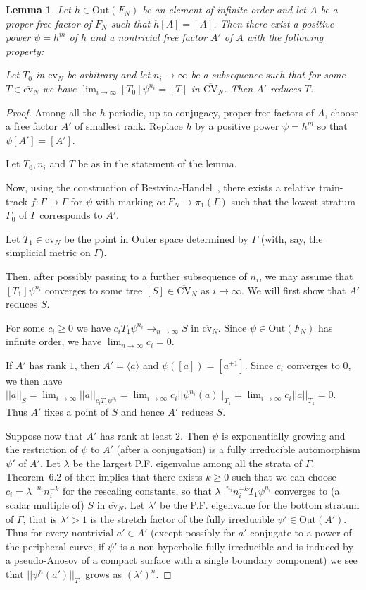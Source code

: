 \documentclass[10pt]{amsart}
\newcommand\<{\langle}
\renewcommand\>{\rangle}
\newcommand{\Out}{\mbox{Out}}
\newcommand{\cvn}{\mbox{cv}_N}
\newcommand{\cvnbar}{\overline{\mbox{cv}}_N}
\newcommand{\CVNbar}{\overline{\mbox{CV}}_N}
\newtheorem{lem}[thm]{Lemma}
\theoremstyle{definition}
\begin{document}
\begin{lem}\label{lem:reduce}
Let $h\in \Out(F_N)$ be an element of infinite order and let $A$ be a
proper free factor of $F_N$ such that $h[A]=[A]$. Then there exist a positive power $\psi=h^m$ of $h$ and a nontrivial
free factor $A'$ of $A$ with the following property:

 Let $T_0$ in $\cvn$ be arbitrary and let $n_i\to\infty$ be a
 subsequence such that for some $T\in\cvnbar$ we have $\lim_{i\to\infty} [T_0]\psi^{n_i}=[T]$ in $\CVNbar$.
 Then $A'$ reduces $T$.
\end{lem}


\begin{proof}
Among all the $h$-periodic, up to conjugacy, proper free factors of
$A$, choose a free factor $A'$ of smallest rank. Replace $h$ by a
positive power $\psi=h^m$ so that $\psi[A']=[A']$.

Let $T_0, n_i$ and $T$ be as in the statement of the lemma.

Now, using the construction of Bestvina-Handel~\cite{BH92},  there exists a relative train-track $f:\Gamma\to\Gamma$ for $\psi$ with
marking $\alpha:F_N\to\pi_1(\Gamma)$ such that the lowest
stratum $\Gamma_0$ of $\Gamma$ corresponds to $A'$.

Let $T_1\in \cvn$ be the point in Outer space determined by $\Gamma$
(with, say, the simplicial metric on $\Gamma$).

Then, after possibly passing to a further subsequence of $n_i$, we may assume that $[T_1]\psi^{n_i}$ converges to some tree $[S]\in \CVNbar$ as
$i\to\infty$.  We will first show that $A'$ reduces $S$.

For some $c_i\ge 0$ we have $c_iT_1\psi^{n_i}\to_{n\to\infty} S$ in $\cvnbar$.
Since $\psi\in\Out(F_N)$ has infinite order, we have $\lim_{n\to\infty}
c_i=0$.


If $A'$ has rank $1$, then $A'=\langle a \rangle$ and $\psi([a])=[a^{\pm
  1}]$. Since $c_i$ converges to $0$, we then have
$||a||_S=\lim_{i\to\infty} ||a||_{c_iT_1\psi^{n_i}}=\lim_{i\to\infty} c_i
||\psi^{n_i}(a)||_{T_1}=\lim_{i\to\infty} c_i ||a||_{T_1}=0$.
Thus $A'$ fixes a point of $S$ and hence $A'$ reduces $S$.


Suppose now that $A'$ has rank at least $2$. Then $\psi$ is
exponentially growing and the restriction of $\psi$ to $A'$ (after a
conjugation) is a fully irreducible automorphism $\psi'$ of $A'$. Let $\lambda$ be the largest P.F. eigenvalue among all the strata of $\Gamma$.
Theorem~6.2 of \cite{L} then implies that there exists $k\ge 0$ such that we can choose $c_i=\lambda^{-n_i}n_i^{-k}$ for the rescaling constants, 
so that $\lambda^{-n_i}n_i^{-k}T_1 \psi^{n_i}$ converges to (a scalar multiple of) $S$ in $\cvnbar$.  Let
$\lambda'$ be the P.F. eigenvalue for the bottom stratum of $\Gamma$,
that is $\lambda'>1$ is the stretch factor of the fully irreducible
$\psi'\in \Out(A')$. Thus for every nontrivial $a'\in A'$ (except possibly for $a'$ conjugate to a power of the peripheral curve, if $\psi'$ is a  non-hyperbolic fully irreducible and is induced by a pseudo-Anosov of a compact surface with a single boundary component)  we see that $||\psi^n(a')||_{T_1}$ grows as $(\lambda')^n$.



\end{proof}
\end{document}
